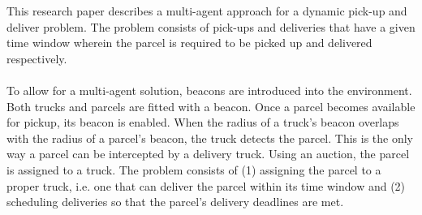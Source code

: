 \documentclass[../main.tex]{subfiles}
\begin{document}
This research paper describes a multi-agent approach for a dynamic pick-up and deliver problem. The problem consists of pick-ups and deliveries that have a given time window wherein the parcel is required to be picked up and delivered respectively.
\\\\
To allow for a multi-agent solution, beacons are introduced into the environment. Both trucks and parcels are fitted with a beacon. Once a parcel becomes available for pickup, its beacon is enabled. When the radius of a truck's beacon overlaps with the radius of a parcel's beacon, the truck detects the parcel. This is the only way a parcel can be intercepted by a delivery truck. Using an auction, the parcel is assigned to a truck. The problem consists of (1) assigning the parcel to a proper truck, i.e. one that can deliver the parcel within its time window and (2) scheduling deliveries so that the parcel's delivery deadlines are met.
\end{document}
